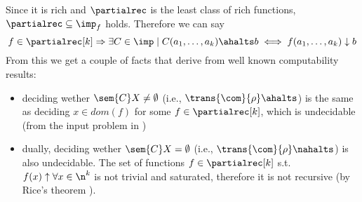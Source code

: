 Since it is rich and \(\partialrec\) is the least class of rich
functions, \(\partialrec \subseteq \imp_f\) holds. Therefore we can
say \[f \in \partialrec[k] \Rightarrow \exists C \in \imp \mid C(a_1,
\dots, a_k)\ahalts b \iff f(a_1, \dots, a_k) \downarrow b\] From
this we get a couple of facts that derive from well known
computability results:
\begin{itemize}
\item deciding wether \(\sem{C}X \neq \emptyset\) (i.e.,
  \(\trans{\com}{\rho}\ahalts\)) is the same as deciding \(x \in
  dom(f)\) for some \(f \in \partialrec[k]\), which is undecidable
  (from the input problem in \cite[p.~104]{cutland1980computability})
\item dually, deciding wether \(\sem{C}X = \emptyset\) (i.e.,
  \(\trans{\com}{\rho} \nahalts\)) is also undecidable. The set of
  functions \(f\in \partialrec[k]\) s.t. \(f(x) \uparrow \forall x \in
  \n^k\) is not trivial and saturated, therefore it is not recursive
  (by Rice's theorem \cite{rice1953classes}).
\end{itemize}
